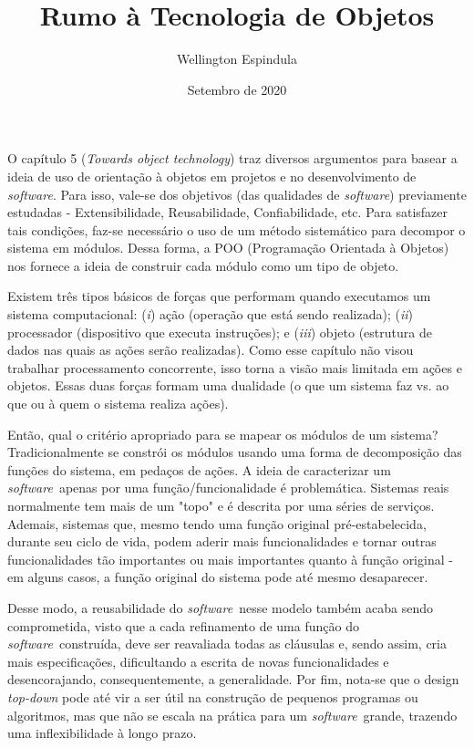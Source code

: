 \documentclass[12pt, a4paper]{article}
\title{Rumo à Tecnologia de Objetos}
\author{Wellington Espindula}
\date{Setembro de 2020}
\newcommand{\tit}[1]{\textit{#1}}
\newcommand{\sw}{\tit{software}}
\newcommand{\iitem}[1]{(\tit{#1})}
\begin{document}
    \maketitle
    
    O capítulo 5 (\tit{Towards object technology}) traz diversos argumentos para basear a ideia de uso de orientação à objetos em projetos e no desenvolvimento de \sw. Para isso, vale-se dos objetivos (das qualidades de \sw) previamente estudadas - Extensibilidade, Reusabilidade, Confiabilidade, etc. Para satisfazer tais condições, faz-se necessário o uso de um método sistemático para decompor o sistema em módulos.
    Dessa forma, a POO (Programação Orientada à Objetos) nos fornece a ideia de construir cada módulo como um tipo de objeto. 
    
    Existem três tipos básicos de forças que performam quando executamos um sistema computacional: \iitem{i} ação (operação que está sendo realizada); \iitem{ii} processador (dispositivo que executa instruções); e \iitem{iii} objeto (estrutura de dados nas quais as ações serão realizadas). Como esse capítulo não visou trabalhar processamento concorrente, isso torna a visão mais limitada em ações e objetos. Essas duas forças formam uma dualidade (o que um sistema faz vs. ao que ou à quem o sistema realiza ações).
    
    Então, qual o critério apropriado para se mapear os módulos de um sistema? Tradicionalmente se constrói os módulos usando uma forma de decomposição das funções do sistema, em pedaços de ações. A ideia de caracterizar um \sw \ apenas por uma função/funcionalidade é problemática. Sistemas reais normalmente tem mais de um "topo" e é descrita por uma séries de serviços. Ademais, sistemas que, mesmo tendo uma função original pré-estabelecida, durante seu ciclo de vida, podem aderir mais funcionalidades e tornar outras funcionalidades tão importantes ou mais importantes quanto à função original - em alguns casos, a função original do sistema pode até mesmo desaparecer. 
    
    Desse modo, a reusabilidade do \sw \ nesse modelo também acaba sendo comprometida, visto que a cada refinamento de uma função do \sw \ construída, deve ser reavaliada todas as cláusulas e, sendo assim, cria mais especificações, dificultando a escrita de novas funcionalidades e desencorajando, consequentemente, a generalidade. Por fim, nota-se que o design \tit{top-down} pode até vir a ser útil na construção de pequenos programas ou algoritmos, mas que não se escala na prática para um \sw \ grande, trazendo uma inflexibilidade à longo prazo.
   
\end{document}
